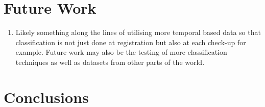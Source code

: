 \documentclass{sig-alternate-05-2015}
\begin{document}
\section{Future Work}
\begin{enumerate}
	\item Likely something along the lines of utilising more temporal based data so that classification is not just done at registration but also at each check-up for example. Future work may also be the testing of more classification techniques as well as datasets from other parts of the world.
\end{enumerate}

\section{Conclusions}

%

%
\end{document}
